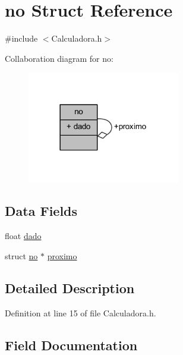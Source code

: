 \hypertarget{structno}{}\section{no Struct Reference}
\label{structno}


{\ttfamily \#include $<$Calculadora.\+h$>$}



Collaboration diagram for no\+:
\nopagebreak
\begin{figure}[H]
\begin{center}
\leavevmode
\includegraphics[width=189pt]{structno__coll__graph}
\end{center}
\end{figure}
\subsection*{Data Fields}
\begin{DoxyCompactItemize}
\item 
float \mbox{\hyperlink{structno_a14ddb52e8b1bf70f6adf49d9dc2e23f5}{dado}}
\item 
struct \mbox{\hyperlink{structno}{no}} $\ast$ \mbox{\hyperlink{structno_ac5dac914c4194e089f197231896fa8e0}{proximo}}
\end{DoxyCompactItemize}


\subsection{Detailed Description}


Definition at line 15 of file Calculadora.\+h.



\subsection{Field Documentation}
\mbox{\label{structno_a14ddb52e8b1bf70f6adf49d9dc2e23f5}} 

